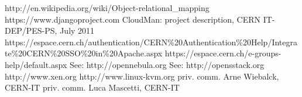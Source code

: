 %
%
http://en.wikipedia.org/wiki/Object-relational\_mapping
https://www.djangoproject.com
CloudMan: project description, CERN IT-DEP/PES-PS, July 2011
https://espace.cern.ch/authentication/CERN\%20Authentication\%20Help/Integrate\%20CERN\%20SSO\%20in\%20Apache.aspx
https://espace.cern.ch/e-groups-help/default.aspx
See: http://opennebula.org
See: http://opensstack.org
http://www.xen.org
http://www.linux-kvm.org
priv. comm. Arne Wiebalck, CERN-IT
priv. comm. Luca Mascetti, CERN-IT
